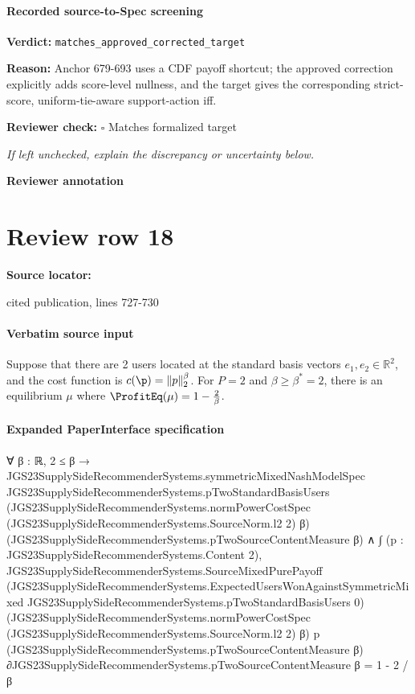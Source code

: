\documentclass[10pt]{article}
\newcommand{\reviewerbox}{%
  \par\noindent\fbox{\parbox{0.96\linewidth}{\rule{0pt}{0.38in}}}\par
}
\newcommand{\reviewmatch}[1]{%
  \par\noindent\textbf{Reviewer check:} $\square$\; #1\par
  \noindent\emph{If left unchecked, explain the discrepancy or uncertainty below.}\par
}
\begin{document}
\paragraph{Recorded source-to-Spec screening}
\textbf{Verdict:} \texttt{matches\_approved\_corrected\_target}
\\
{\raggedright
\textbf{Reason:} Anchor 679-\allowbreak{}693 uses a CDF payoff shortcut;\allowbreak{} the approved correction explicitly adds score-\allowbreak{}level nullness, and the target gives the corresponding strict-\allowbreak{}score, uniform-\allowbreak{}tie-\allowbreak{}aware support-\allowbreak{}action iff.\allowbreak{}
\par}
\reviewmatch{Matches formalized target}
\noindent\textbf{Reviewer annotation}\par
\reviewerbox
\clearpage
\hypertarget{source-claim-9c38879758df697d}{}
\section*{Review row 18}
\textbf{Source locator:} {\footnotesize\raggedright cited publication, lines 727-\allowbreak{}730\par}
\paragraph{Verbatim source input}
\begin{ReviewVerbatim}
\begin{corollary}
\label{cor:2usersprofit}
Suppose that there are 2 users located at the standard basis vectors $e_1, e_2 \in \mathbb{R}^2$, and the cost function is $c(\p) = \|p\|_2^{\beta}$. For $P = 2$ and $\beta \ge \beta^* = 2$, there is an equilibrium $\mu$ where $\ProfitEq(\mu) = 1 - \frac{2}{\beta}$.
\end{corollary}
\end{ReviewVerbatim}



\paragraph{Expanded PaperInterface specification}
\begin{ReviewVerbatim}
∀ {β : ℝ},
  2 ≤ β →
    JGS23SupplySideRecommenderSystems.symmetricMixedNashModelSpec
        JGS23SupplySideRecommenderSystems.pTwoStandardBasisUsers
        (JGS23SupplySideRecommenderSystems.normPowerCostSpec (JGS23SupplySideRecommenderSystems.SourceNorm.l2 2) β)
        (JGS23SupplySideRecommenderSystems.pTwoSourceContentMeasure β) ∧
      ∫ (p : JGS23SupplySideRecommenderSystems.Content 2),
          JGS23SupplySideRecommenderSystems.SourceMixedPurePayoff
            (JGS23SupplySideRecommenderSystems.ExpectedUsersWonAgainstSymmetricMixed
              JGS23SupplySideRecommenderSystems.pTwoStandardBasisUsers 0)
            (JGS23SupplySideRecommenderSystems.normPowerCostSpec (JGS23SupplySideRecommenderSystems.SourceNorm.l2 2) β)
            p
            (JGS23SupplySideRecommenderSystems.pTwoSourceContentMeasure
              β) ∂JGS23SupplySideRecommenderSystems.pTwoSourceContentMeasure β =
        1 - 2 / β
\end{ReviewVerbatim}
\end{document}
